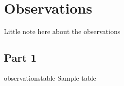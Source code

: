 \chapter{Observations}

Little note here about the observations

\section{Part 1}

\begin{lrtable}{observations}{table}
{Sample table}
\end{lrtable}